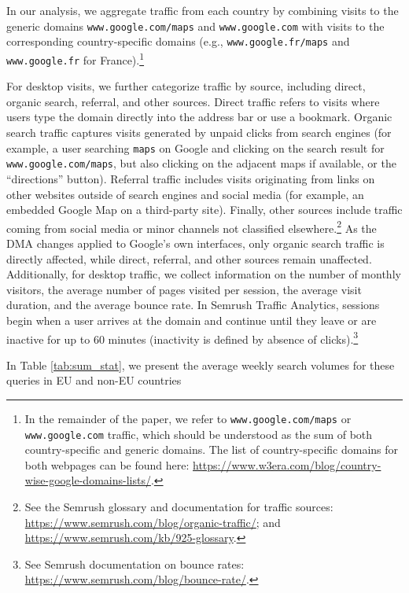 \documentclass[11pt]{article}
\begin{document}
	In our analysis, we aggregate traffic from each country by combining visits to the generic domains \texttt{www.google.com/maps} and \texttt{www.google.com} with visits to the corresponding country-specific domains (e.g., \texttt{www.google.fr/maps} and \texttt{www.google.fr} for France).\footnote{In the remainder of the paper, we refer to \texttt{www.google.com/maps} or \texttt{www.google.com} traffic, which should be understood as the sum of both country-specific and generic domains. The list of country-specific domains for both webpages can be found here: \href{https://www.w3era.com/blog/country-wise-google-domains-lists/}{https://www.w3era.com/blog/country-wise-google-domains-lists/}.}
	
	
	For desktop visits, we further categorize traffic by source, including direct, organic search, referral, and other sources. Direct traffic refers to visits where users type the domain directly into the address bar or use a bookmark. Organic search traffic captures visits generated by unpaid clicks from search engines (for example, a user searching \texttt{maps} on Google and clicking on the search result for \texttt{www.google.com/maps}, but also clicking on the adjacent maps if available, or the ``directions'' button). Referral traffic includes visits originating from links on other websites outside of search engines and social media (for example, an embedded Google Map on a third-party site). Finally, other sources include traffic coming from social media or minor channels not classified elsewhere.\footnote{See the Semrush glossary and documentation for traffic sources: \href{https://www.semrush.com/blog/organic-traffic/}{https://www.semrush.com/blog/organic-traffic/}; and \href{https://www.semrush.com/kb/925-glossary}{https://www.semrush.com/kb/925-glossary}.} As the DMA changes applied to Google's own interfaces, only organic search traffic is directly affected, while direct, referral, and other sources remain unaffected. Additionally, for desktop traffic, we collect information on the number of monthly visitors, the average number of pages visited per session, the average visit duration, and the average bounce rate. In Semrush Traffic Analytics, sessions begin when a user arrives at the domain and continue until they leave or are inactive for up to 60 minutes (inactivity is defined by absence of clicks).\footnote{See Semrush documentation on bounce rates: \href{https://www.semrush.com/blog/bounce-rate/}{https://www.semrush.com/blog/bounce-rate/}.}
	
	In Table \ref{tab:sum_stat}, we present the average weekly search volumes for these queries in EU and non-EU countries 
	
\end{document}
